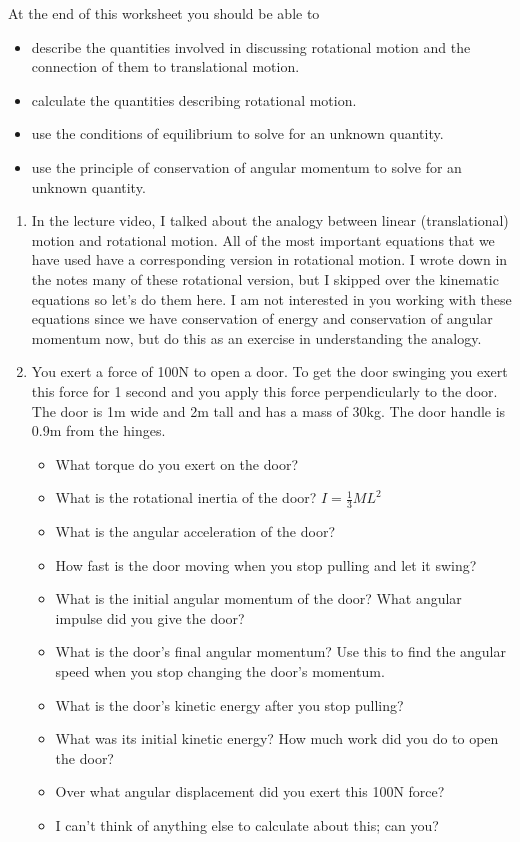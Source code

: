 At the end of this worksheet you should be able to  
\begin{itemize}
	\item describe the quantities involved in discussing rotational motion and the connection of them to translational motion.
	\item calculate the quantities describing rotational motion.
	\item use the conditions of equilibrium to solve for an unknown quantity.
	\item use the principle of conservation of angular momentum to solve for an unknown quantity.
\end{itemize}


\begin{enumerate}
	\setlength\itemsep{1 in}
	
	\item
	In the lecture video, I talked about the analogy between linear (translational) motion and rotational motion. All of the most important equations that we have used have a corresponding version in rotational motion. I wrote down in the notes many of these rotational version, but I skipped over the kinematic equations so let's do them here. I am not interested in you working with these equations since we have conservation of energy and conservation of angular momentum now, but do this as an exercise in understanding the analogy. 
	
	\item
	You exert a force of 100N to open a door. To get the door swinging you exert this force for 1 second and you apply this force perpendicularly to the door. The door is 1m wide and 2m tall and has a mass of 30kg. The door handle is 0.9m from the hinges. 
	\begin{itemize}
		\setlength\itemsep{1 in}
		\item What torque do you exert on the door?
		\item What is the rotational inertia of the door? $I=\frac{1}{3}ML^2$
		\item What is the angular acceleration of the door?
		\item How fast is the door moving when you stop pulling and let it swing?
		\item What is the initial angular momentum of the door? What angular impulse did you give the door? 
		\item What is the door's final angular momentum? Use this to find the angular speed when you stop changing the door's momentum.
		\item What is the door's kinetic energy after you stop pulling?
		\item What was its initial kinetic energy? How much work did you do to open the door?
		\item Over what angular displacement did you exert this 100N force?
		\item I can't think of anything else to calculate about this; can you?
	\end{itemize}
	

\end{enumerate}
